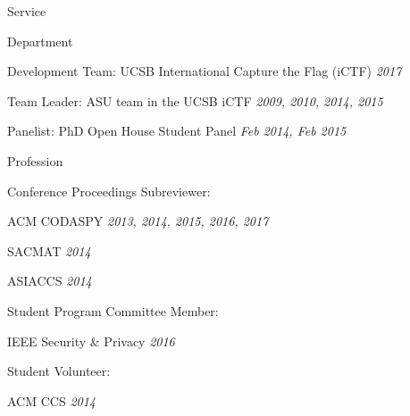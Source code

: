 
\begin{rSection}{Service}

  \begin{rBulletSubsection}{Department}

    \item Development Team: UCSB International Capture the Flag (iCTF) \hfill \emph{2017}

    \item Team Leader: ASU team in the UCSB iCTF \hfill \emph{2009, 2010, 2014, 2015}

    \item Panelist: PhD Open House Student Panel \hfill \emph{Feb 2014, Feb 2015}

  \end{rBulletSubsection}

  \begin{rBulletSubsection}{Profession}

    \item Conference Proceedings Subreviewer:
      \begin{rBulletList}

        \item ACM CODASPY \hfill \emph{2013, 2014, 2015, 2016, 2017}

        \item SACMAT \hfill \emph{2014}

        \item ASIACCS \hfill \emph{2014}

      \end{rBulletList}

    \item Student Program Committee Member:
      \begin{rBulletList}

        \item IEEE Security \& Privacy \hfill \emph{2016}

      \end{rBulletList}

    \item Student Volunteer:
      \begin{rBulletList}

        \item ACM CCS \hfill \emph{2014}

      \end{rBulletList}

  \end{rBulletSubsection}


\end{rSection}
